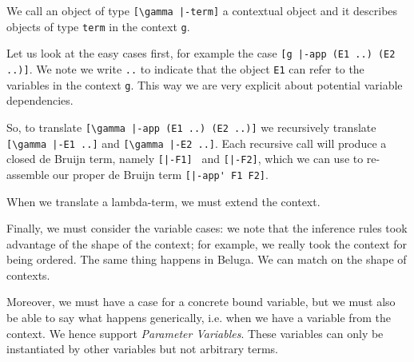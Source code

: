 We call an object of type \lstinline![\gamma |-term]! a contextual object and
it describes objects of type \lstinline!term! in the context
\lstinline!g!.

Let us look at the easy cases first, for example the case
\lstinline![g |-app (E1 ..) (E2 ..)]!.  We note we write \lstinline!..!
to indicate that the object \lstinline!E1! can refer to the variables
in the context \lstinline!g!. This way we are very explicit about
potential variable dependencies.

So, to translate \lstinline![\gamma |-app (E1 ..) (E2 ..)]! we recursively
translate \lstinline![\gamma |-E1 ..]! and \lstinline![\gamma |-E2 ..]!. Each
recursive call will produce a closed de Bruijn term, namely
\lstinline![|-F1] ! and \lstinline![|-F2]!, which we can use to
re-assemble our proper de Bruijn term \lstinline![|-app' F1 F2]!.

When we translate a lambda-term, we must extend the context.


Finally, we must consider the variable cases: we note that the
inference rules took advantage of the shape of the context; for
example, we really took the context for being ordered. The same thing
happens in Beluga. We can match on the shape of contexts.


Moreover, we must have a case for a concrete bound variable, but we
must also be able to say what happens generically, i.e. when we have a
variable from the context. We hence support \emph{Parameter
  Variables}. These variables can only be instantiated by other
variables but not arbitrary terms.








